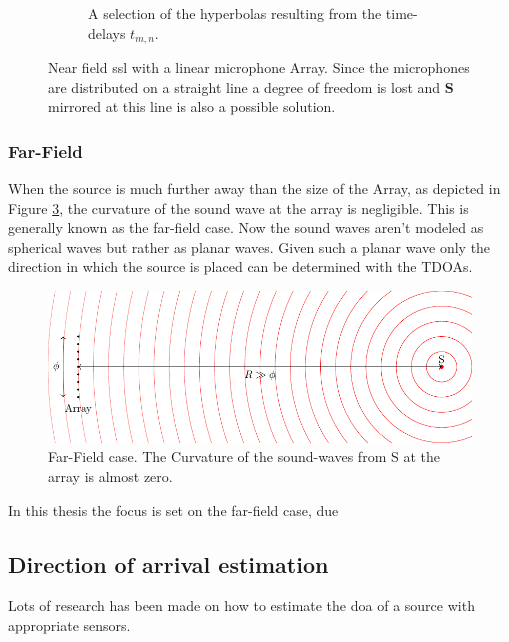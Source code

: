 \begin{figure}[h]
\begin{subfigure}[b]{0.45\textwidth}
		\caption{A selection of the hyperbolas resulting from the time-delays $t_{m,n}$.}
		\label{ssl:fig:hyperbola}
	\end{subfigure}
	\caption{Near field \acrshort{ssl} with a linear microphone Array.
		Since the microphones are distributed on a straight line a degree of freedom is lost and
		$\bm{S}$ mirrored at this line is also a possible solution.}
	\label{fig:three graphs}
\end{figure}

\subsubsection{Far-Field}
When the source is much further away than the size of the Array, as depicted
in Figure \ref{ssl:fig:far field}, the curvature of the sound wave at the array is negligible.
This is generally known as the far-field case.
Now the sound waves aren't modeled as spherical waves but rather as planar waves.
Given such a planar wave only the direction in which the source is placed can be determined with the TDOAs.


\begin{figure}
	\centering
	\includegraphics[]{FarField.pdf}
	\caption{Far-Field case. The Curvature of the sound-waves from S at the array
		is almost zero.}
	\label{ssl:fig:far field}
\end{figure}

In this thesis the focus is set on the far-field case, due

\subsection{Direction of arrival estimation}
Lots of research has been made on how to estimate the \acrfull*{doa} of a source
with appropriate sensors.


